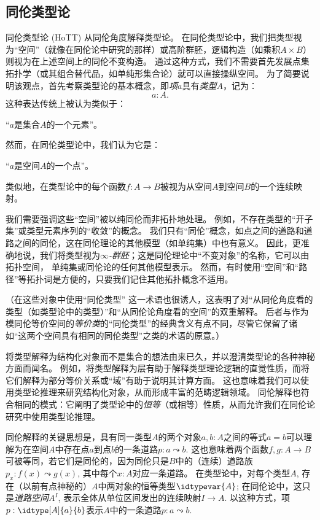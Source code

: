 \subsection*{同伦类型论}

同伦类型论 (HoTT) 从同伦角度解释类型论。
在同伦类型论中，我们把类型视为“空间”（就像在同伦论中研究的那样）或高阶群胚，逻辑构造（如乘积$A\times B$）则视为在上述空间上的同伦不变构造。
通过这种方式，我们不需要首先发展点集拓扑学（或其组合替代品，如单纯形集合论）就可以直接操纵空间。
为了简要说明该观点，首先考察类型论的基本概念，即\emph{项}$a$具有\emph{类型}$A$，记为：
\[ a:A. \]
这种表达传统上被认为类似于：
\begin{center}
“$a$是集合$A$的一个元素”。
\end{center}
然而，在同伦类型论中，我们认为它是：
\begin{center}
“$a$是空间$A$的一个点”。
\end{center}
%
类似地，在类型论中的每个函数$f : A\to B$被视为从空间$A$到空间$B$的一个连续映射。

我们需要强调这些“空间”被以纯同伦而非拓扑地处理。
例如，不存在类型的“开子集”或类型元素序列的“收敛”的概念。
我们只有“同伦”概念，如点之间的道路和道路之间的同伦，这在同伦理论的其他模型（如单纯集）中也有意义。
因此，更准确地说，我们将类型视为\emph{$\infty$-群胚}；这是同伦理论中“不变对象”的名称，它可以由拓扑空间，
%
单纯集或同伦论的任何其他模型表示。
然而，有时使用“空间”和“路径”等拓扑词是方便的，只要我们记住其他拓扑概念不适用。

（在这些对象中使用“同伦类型”
%
这一术语也很诱人，这表明了对“从同伦角度看的类型（如类型论中的类型）”和“从同伦论角度看的空间”的双重解释。
后者与作为模同伦等价空间的\emph{等价类}的“同伦类型”的经典含义有点不同，尽管它保留了诸如“这两个空间具有相同的同伦类型”之类的术语的原意。）

将类型解释为结构化对象而不是集合的想法由来已久，并以澄清类型论的各种神秘方面而闻名。
例如，将类型解释为层有助于解释类型理论逻辑的直觉性质，而将它们解释为部分等价关系或“域”有助于说明其计算方面。
这也意味着我们可以使用类型论推理来研究结构化对象，从而形成丰富的范畴逻辑领域。
同伦解释也符合相同的模式：它阐明了类型论中的\emph{恒等}（或相等）性质，从而允许我们在同伦论研究中使用类型论推理。

同伦解释的关键思想是，具有同一类型$A$的两个对象$a, b: A$之间的等式$a = b$可以理解为在空间$A$中存在点$a$到点$b$的一条道路$p : a \leadsto b$.
这也意味着两个函数$f, g: A\to B$可被等同，若它们是同伦的，因为同伦只是$B$中的（连续）道路族$p_x: f(x) \leadsto g(x)$, 其中每个$x:A$对应一条道路。
在类型论中，对每个类型$A$, 存在（以前有点神秘的）$A$中两对象的恒等类型$\idtypevar{A}$; 在同伦论中，这只是\emph{道路空间}$A^I$, 表示全体从单位区间发出的连续映射$I\to A$.
%
%
%
%
以这种方式，项$p : \idtype[A]{a}{b}$表示$A$中的一条道路$p : a \leadsto b$. 

